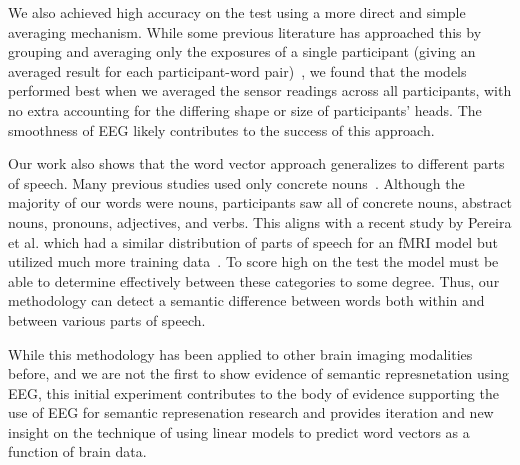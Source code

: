 We also achieved high accuracy on the \tvt test using a more direct and simple 
averaging mechanism. While some previous literature has approached this by 
grouping and averaging only the exposures of a single participant (giving an 
averaged result for each participant-word pair)~\cite{Mitchell2008,Sudre2012}, 
we found that the models performed best when we averaged the sensor readings 
across all participants, with no extra accounting for the differing shape or 
size of participants' heads. The smoothness of EEG likely contributes to the 
success of this approach.

Our work also shows that the word vector approach generalizes to different 
parts of speech. Many previous studies used only concrete 
nouns~\cite{Mitchell2008,Sudre2012,Murphy2009}. Although the majority of our 
words were nouns, participants saw all of concrete nouns, abstract nouns, 
pronouns, adjectives, and verbs. This aligns with a recent study by Pereira et 
al. which had a similar distribution of parts of speech for an fMRI model but 
utilized much more training data~\cite{pereira2018toward}. To score high on the 
\tvt test the model must be able to determine effectively between these 
categories to some degree. Thus, our methodology can detect a semantic 
difference between words both within and between various parts of speech.

While this methodology has been applied to other brain imaging modalities 
before, and we are not the first to show evidence of semantic represnetation 
using EEG, this initial experiment contributes to the body of evidence 
supporting the use of EEG for semantic represenation research and provides 
iteration and new insight on the technique of using linear models to predict 
word vectors as a function of brain data.
